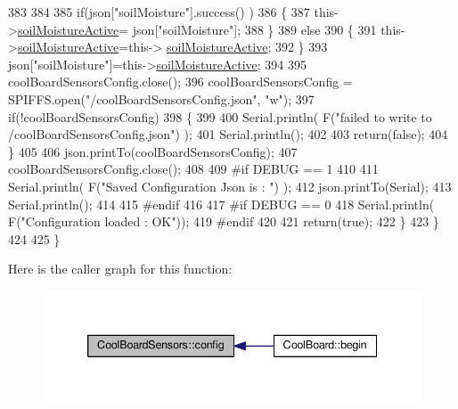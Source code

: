 \begin{DoxyCode}
383 
384             
385             \textcolor{keywordflow}{if}(json[\textcolor{stringliteral}{"soilMoisture"}].success() )
386             \{           
387                 this->\hyperlink{class_cool_board_sensors_a31983eecc0f9cd000e1f912206ea4dc8}{soilMoistureActive}= json[\textcolor{stringliteral}{"soilMoisture"}];
388             \}
389             \textcolor{keywordflow}{else}
390             \{
391                 this->\hyperlink{class_cool_board_sensors_a31983eecc0f9cd000e1f912206ea4dc8}{soilMoistureActive}=this->
      \hyperlink{class_cool_board_sensors_a31983eecc0f9cd000e1f912206ea4dc8}{soilMoistureActive};
392             \}
393             json[\textcolor{stringliteral}{"soilMoisture"}]=this->\hyperlink{class_cool_board_sensors_a31983eecc0f9cd000e1f912206ea4dc8}{soilMoistureActive};
394 
395             coolBoardSensorsConfig.close();         
396             coolBoardSensorsConfig = SPIFFS.open(\textcolor{stringliteral}{"/coolBoardSensorsConfig.json"}, \textcolor{stringliteral}{"w"});          
397             \textcolor{keywordflow}{if}(!coolBoardSensorsConfig)
398             \{
399 
400                 Serial.println( F(\textcolor{stringliteral}{"failed to write to /coolBoardSensorsConfig.json"}) );
401                 Serial.println();
402 
403                 \textcolor{keywordflow}{return}(\textcolor{keyword}{false});          
404             \}  
405 
406             json.printTo(coolBoardSensorsConfig);
407             coolBoardSensorsConfig.close();         
408             
409 \textcolor{preprocessor}{        #if DEBUG == 1}
410 
411             Serial.println( F(\textcolor{stringliteral}{"Saved Configuration Json is : "}) );
412             json.printTo(Serial);
413             Serial.println();
414         
415 \textcolor{preprocessor}{        #endif}
416 
417 \textcolor{preprocessor}{        #if DEBUG == 0}
418             Serial.println( F(\textcolor{stringliteral}{"Configuration loaded : OK"}));
419 \textcolor{preprocessor}{        #endif}
420 
421             \textcolor{keywordflow}{return}(\textcolor{keyword}{true}); 
422         \}
423     \}   
424 
425 \}
\end{DoxyCode}
Here is the caller graph for this function\+:\nopagebreak
\begin{figure}[H]
\begin{center}
\leavevmode
\includegraphics[width=339pt]{de/d46/class_cool_board_sensors_a9a218895c5423375c33c08f2c56fb23a_icgraph}
\end{center}
\end{figure}
\mbox{\label{class_cool_board_sensors_a4902b69f6e628bd6557193758fdd2bae}} 
